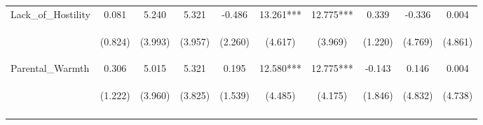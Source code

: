\begin{tabular}{lccccccccc}
\noalign{\smallskip}Lack_of_Hostility & 0.081 & 5.240 & 5.321 & -0.486 & 13.261*** & 12.775*** & 0.339 & -0.336 & 0.004\\
 & \begin{footnotesize}(0.824)\end{footnotesize} & \begin{footnotesize}(3.993)\end{footnotesize} & \begin{footnotesize}(3.957)\end{footnotesize} & \begin{footnotesize}(2.260)\end{footnotesize} & \begin{footnotesize}(4.617)\end{footnotesize} & \begin{footnotesize}(3.969)\end{footnotesize} & \begin{footnotesize}(1.220)\end{footnotesize} & \begin{footnotesize}(4.769)\end{footnotesize} & \begin{footnotesize}(4.861)\end{footnotesize}\\
\noalign{\smallskip}Parental_Warmth & 0.306 & 5.015 & 5.321 & 0.195 & 12.580*** & 12.775*** & -0.143 & 0.146 & 0.004\\
 & \begin{footnotesize}(1.222)\end{footnotesize} & \begin{footnotesize}(3.960)\end{footnotesize} & \begin{footnotesize}(3.825)\end{footnotesize} & \begin{footnotesize}(1.539)\end{footnotesize} & \begin{footnotesize}(4.485)\end{footnotesize} & \begin{footnotesize}(4.175)\end{footnotesize} & \begin{footnotesize}(1.846)\end{footnotesize} & \begin{footnotesize}(4.832)\end{footnotesize} & \begin{footnotesize}(4.738)\end{footnotesize}\\
\noalign{\smallskip}\hline\end{tabular}\\
